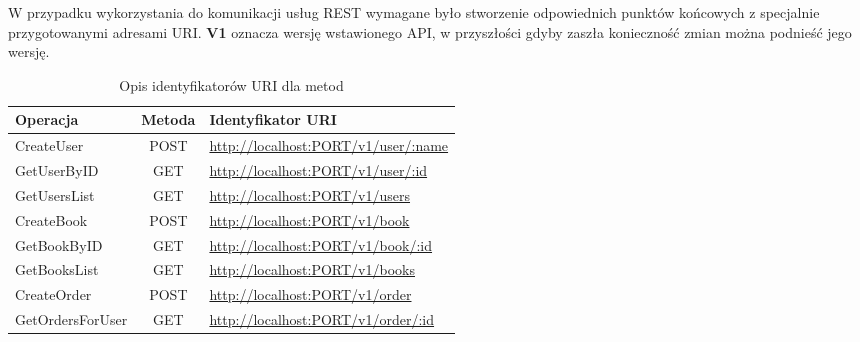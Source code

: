\par W przypadku wykorzystania do komunikacji usług REST wymagane było stworzenie odpowiednich punktów końcowych z specjalnie przygotowanymi adresami URI. \textbf{V1} oznacza wersję wstawionego API, w przyszłości gdyby zaszła konieczność zmian można podnieść jego wersję.
\begin{table}[h]
    \begin{center}
        \caption{Opis identyfikatorów URI dla metod}
        \hspace*{-1cm}
        \begin{tabular}{|M|c|L|}
            \toprule
            \textbf{Operacja} & \textbf{Metoda} & \textbf{Identyfikator URI}                \\
            \midrule
            CreateUser        & POST            & \url{http://localhost:PORT/v1/user/:name} \\
            \midrule
            GetUserByID       & GET             & \url{http://localhost:PORT/v1/user/:id}   \\
            \midrule
            GetUsersList      & GET             & \url{http://localhost:PORT/v1/users}      \\
            \midrule
            CreateBook        & POST            & \url{http://localhost:PORT/v1/book}       \\
            \midrule
            GetBookByID       & GET             & \url{http://localhost:PORT/v1/book/:id}   \\
            \midrule
            GetBooksList      & GET             & \url{http://localhost:PORT/v1/books}      \\
            \midrule
            CreateOrder       & POST            & \url{http://localhost:PORT/v1/order}      \\
            \midrule
            GetOrdersForUser  & GET             & \url{http://localhost:PORT/v1/order/:id}  \\
            \bottomrule
        \end{tabular}
        \hspace*{-1cm}
    \end{center}
\end{table}

